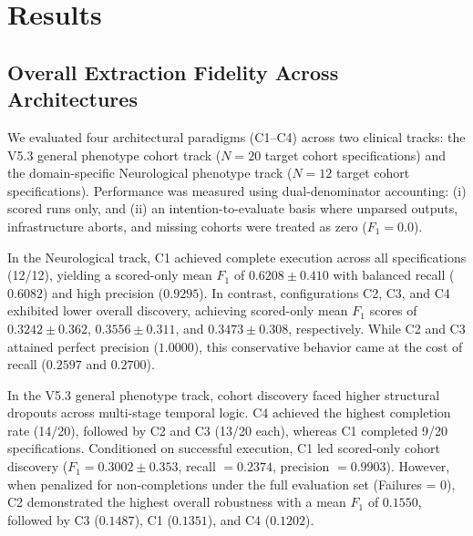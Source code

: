 \section{Results}

\subsection{Overall Extraction Fidelity Across Architectures}
We evaluated four architectural paradigms (C1--C4) across two clinical tracks: the V5.3 general phenotype cohort track ($N=20$ target cohort specifications) and the domain-specific Neurological phenotype track ($N=12$ target cohort specifications). Performance was measured using dual-denominator accounting: (i) scored runs only, and (ii) an intention-to-evaluate basis where unparsed outputs, infrastructure aborts, and missing cohorts were treated as zero ($F_1 = 0.0$).

In the Neurological track, C1 achieved complete execution across all specifications (12/12), yielding a scored-only mean $F_1$ of $0.6208 \pm 0.410$ with balanced recall ($0.6082$) and high precision ($0.9295$). In contrast, configurations C2, C3, and C4 exhibited lower overall discovery, achieving scored-only mean $F_1$ scores of $0.3242 \pm 0.362$, $0.3556 \pm 0.311$, and $0.3473 \pm 0.308$, respectively. While C2 and C3 attained perfect precision ($1.0000$), this conservative behavior came at the cost of recall ($0.2597$ and $0.2700$).

In the V5.3 general phenotype track, cohort discovery faced higher structural dropouts across multi-stage temporal logic. C4 achieved the highest completion rate (14/20), followed by C2 and C3 (13/20 each), whereas C1 completed 9/20 specifications. Conditioned on successful execution, C1 led scored-only cohort discovery ($F_1 = 0.3002 \pm 0.353$, recall $= 0.2374$, precision $= 0.9903$). However, when penalized for non-completions under the full evaluation set (Failures = 0), C2 demonstrated the highest overall robustness with a mean $F_1$ of $0.1550$, followed by C3 ($0.1487$), C1 ($0.1351$), and C4 ($0.1202$).

